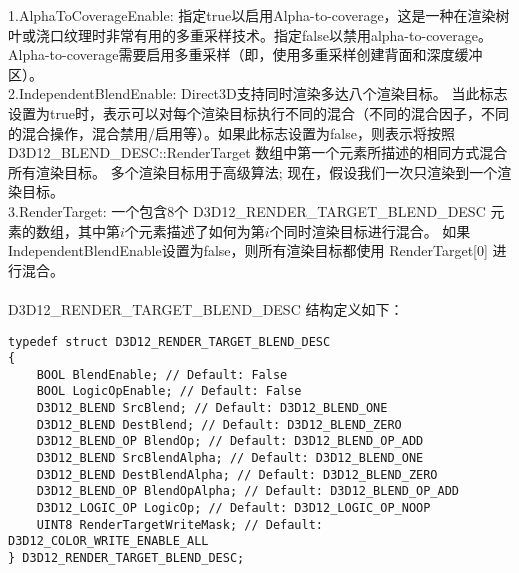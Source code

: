 \begin{flushleft}
1.AlphaToCoverageEnable: 指定true以启用Alpha-to-coverage，这是一种在渲染树叶或浇口纹理时非常有用的多重采样技术。指定false以禁用alpha-to-coverage。Alpha-to-coverage需要启用多重采样（即，使用多重采样创建背面和深度缓冲区）。\\

2.IndependentBlendEnable: Direct3D支持同时渲染多达八个渲染目标。 当此标志设置为true时，表示可以对每个渲染目标执行不同的混合（不同的混合因子，不同的混合操作，混合禁用/启用等）。如果此标志设置为false，则表示将按照 D3D12\_BLEND\_DESC::RenderTarget 数组中第一个元素所描述的相同方式混合所有渲染目标。 多个渲染目标用于高级算法; 现在，假设我们一次只渲染到一个渲染目标。\\

3.RenderTarget: 一个包含8个 D3D12\_RENDER\_TARGET\_BLEND\_DESC 元素的数组，其中第$i$个元素描述了如何为第$i$个同时渲染目标进行混合。 如果IndependentBlendEnable设置为false，则所有渲染目标都使用 RenderTarget[0] 进行混合。\\
~\\
D3D12\_RENDER\_TARGET\_BLEND\_DESC 结构定义如下：\\
\end{flushleft}

\begin{lstlisting}
typedef struct D3D12_RENDER_TARGET_BLEND_DESC
{
    BOOL BlendEnable; // Default: False
    BOOL LogicOpEnable; // Default: False
    D3D12_BLEND SrcBlend; // Default: D3D12_BLEND_ONE
    D3D12_BLEND DestBlend; // Default: D3D12_BLEND_ZERO
    D3D12_BLEND_OP BlendOp; // Default: D3D12_BLEND_OP_ADD
    D3D12_BLEND SrcBlendAlpha; // Default: D3D12_BLEND_ONE
    D3D12_BLEND DestBlendAlpha; // Default: D3D12_BLEND_ZERO
    D3D12_BLEND_OP BlendOpAlpha; // Default: D3D12_BLEND_OP_ADD
    D3D12_LOGIC_OP LogicOp; // Default: D3D12_LOGIC_OP_NOOP
    UINT8 RenderTargetWriteMask; // Default: D3D12_COLOR_WRITE_ENABLE_ALL
} D3D12_RENDER_TARGET_BLEND_DESC;
\end{lstlisting}

